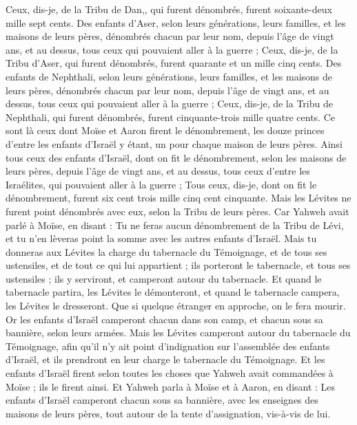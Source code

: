 \begin{multicols}{2}
Ceux, dis-je, de la Tribu de Dan,, qui furent dénombrés, furent soixante-deux mille sept cents.
Des enfants d'Aser, selon leurs générations, leurs familles, et les maisons de leurs pères, dénombrés chacun par leur nom, depuis l'âge de vingt ans, et au dessus, tous ceux qui pouvaient aller à la guerre ;
Ceux, dis-je, de la Tribu d'Aser, qui furent dénombrés, furent quarante et un mille cinq cents.
Des enfants de Nephthali, selon leurs générations, leurs familles, et les maisons de leurs pères, dénombrés chacun par leur nom, depuis l'âge de vingt ans, et au dessus, tous ceux qui pouvaient aller à la guerre ;
Ceux, dis-je, de la Tribu de Nephthali, qui furent dénombrés, furent cinquante-trois mille quatre cents.
Ce sont là ceux dont Moïse et Aaron firent le dénombrement, les douze princes d'entre les enfants d'Israël y étant, un pour chaque maison de leurs pères.
Ainsi tous ceux des enfants d'Israël, dont on fit le dénombrement, selon les maisons de leurs pères, depuis l'âge de vingt ans, et au dessus, tous ceux d'entre les Israélites, qui pouvaient aller à la guerre ;
Tous ceux, dis-je, dont on fit le dénombrement, furent six cent trois mille cinq cent cinquante.
Mais les Lévites ne furent point dénombrés avec eux, selon la Tribu de leurs pères.
Car Yahweh avait parlé à Moïse, en disant :
Tu ne feras aucun dénombrement de la Tribu de Lévi, et tu n'en lèveras point la somme avec les autres enfants d'Israël.
Mais tu donneras aux Lévites la charge du tabernacle du Témoignage, et de tous ses ustensiles, et de tout ce qui lui appartient ; ils porteront le tabernacle, et tous ses ustensiles ; ils y serviront, et camperont autour du tabernacle.
Et quand le tabernacle partira, les Lévites le démonteront, et quand le tabernacle campera, les Lévites le dresseront. Que si quelque étranger en approche, on le fera mourir.
Or les enfants d'Israël camperont chacun dans son camp, et chacun sous sa bannière, selon leurs armées.
Mais les Lévites camperont autour du tabernacle du Témoignage, afin qu'il n'y ait point d'indignation sur l'assemblée des enfants d'Israël, et ils prendront en leur charge le tabernacle du Témoignage.
Et les enfants d'Israël firent selon toutes les choses que Yahweh avait commandées à Moïse ; ils le firent ainsi.
\VerseOne{}Et Yahweh parla à Moïse et à Aaron, en disant :
Les enfants d'Israël camperont chacun sous sa bannière, avec les enseignes des maisons de leurs pères, tout autour de la tente d'assignation, vis-à-vis de lui.

\end{multicols}
